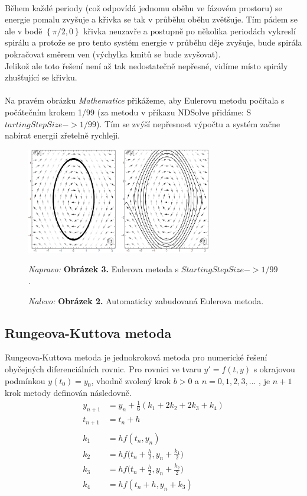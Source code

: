 \documentclass[reqno, a4paper]{amsart}
\begin{document}
				\\
				Během každé periody (což odpovídá jednomu oběhu ve fázovém prostoru) se energie pomalu zvyšuje a křivka se tak v průběhu oběhu zvětšuje. Tím pádem se ale v bodě $\left\lbrace \pi/2,0\right\rbrace $ křivka neuzavře a postupně po několika periodách vykreslí spirálu a protože se pro tento systém energie v průběhu děje zvyšuje, bude spirála pokračovat směrem ven (výchylka kmitů se bude zvyšovat). 
				\\
				Jelikož ale toto řešení není až tak nedostatečně nepřesné, vidíme místo spirály zhušťující se křivku.
				\\
				\\
				Na pravém obrázku \textit{Mathematice} přikážeme, aby Eulerovu metodu počítala s počátečním krokem 1/99 (za metodu v příkazu NDSolve přidáme: S$ tartingStepSize -> 1/99 $). Tím se zvýší nepřesnost výpočtu a systém začne nabírat energii zřetelně rychleji.
				\begin{figure}[h]
					\centering
					\includegraphics[width=0.72\textwidth]{pole2}
					\caption*{\textit{Nalevo:} \textbf{Obrázek 2.} Automaticky zabudovaná Eulerova metoda.}  \textit{Napravo:} \textbf{Obrázek 3.} Eulerova metoda s $StartingStepSize -> 1/99$.
				\end{figure}
				\clearpage
				\subsection{Rungeova-Kuttova metoda}
				\label{sec:Rungeova-Kuttova metoda}
				Rungeova-Kuttova metoda je jednokroková metoda pro numerické řešení obyčejných diferenciálních rovnic. Pro rovnici ve tvaru \( y'= f(t,y)\) s okrajovou podmínkou \(y(t_0)=y_0 \), vhodně zvolený krok \(b>0\) a \(n = 0, 1, 2, 3, ...\) , je $n+1$ krok metody definován následovně.
				\begin{align*}
					y_{n+1} &= y_n + \frac{1}{6} (k_1 + 2k_2 +2k_3 +k_4) \\
					t_{n+1} &= t_n +h \\ \\
					k_1 &= h f(t_n,y_n) \\
					k_2 &= h f\Big(t_n + \frac{h}{2},y_n + \frac{k_1}{2}\Big) \\
					k_3 &= h f\Big(t_n + \frac{h}{2},y_n + \frac{k_2}{2}\Big) \\
					k_4 &= h f(t_n + h ,y_n + k_3) 
				\end{align*}
\end{document}
